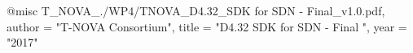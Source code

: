 @misc{ T_NOVA_./WP4/TNOVA_D4.32_SDK for SDN - Final_v1.0.pdf,
       author = "T-NOVA Consortium",
       title = "D4.32 SDK for SDN - Final ",
       year = "2017" }
